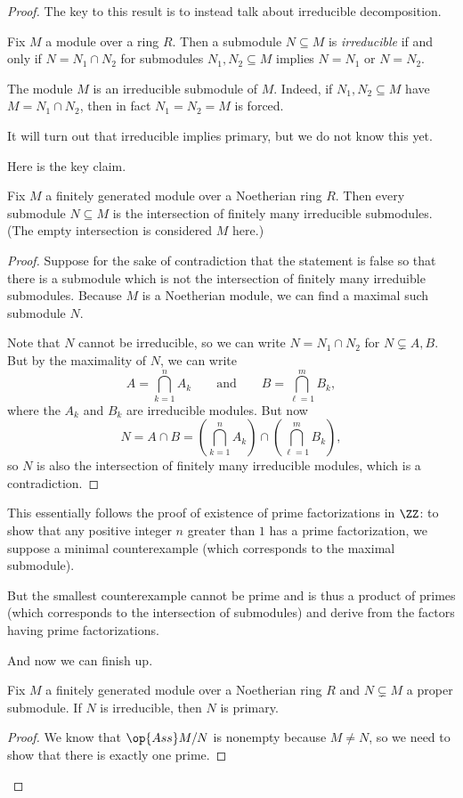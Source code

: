 \begin{proof}
	The key to this result is to instead talk about irreducible decomposition.
	\begin{definition}[Irreducible]
		Fix $M$ a module over a ring $R$. Then a submodule $N\subseteq M$ is \textit{irreducible} if and only if $N=N_1\cap N_2$ for submodules $N_1,N_2\subseteq M$ implies $N=N_1$ or $N=N_2$.
	\end{definition}
	\begin{example} \label{ex:totalisirred}
		The module $M$ is an irreducible submodule of $M$. Indeed, if $N_1,N_2\subseteq M$ have $M=N_1\cap N_2$, then in fact $N_1=N_2=M$ is forced.
	\end{example}
	It will turn out that irreducible implies primary, but we do not know this yet.

	Here is the key claim.
	\begin{lemma}
		Fix $M$ a finitely generated module over a Noetherian ring $R$. Then every submodule $N\subseteq M$ is the intersection of finitely many irreducible submodules. (The empty intersection is considered $M$ here.)
	\end{lemma}
	\begin{proof}
		Suppose for the sake of contradiction that the statement is false so that there is a submodule which is not the intersection of finitely many irreduible submodules. Because $M$ is a Noetherian module, we can find a maximal such submodule $N$.

		Note that $N$ cannot be irreducible, so we can write $N=N_1\cap N_2$ for $N\subsetneq A,B$. But by the maximality of $N$, we can write
		\[A=\bigcap_{k=1}^nA_k\qquad\text{and}\qquad B=\bigcap_{\ell=1}^mB_k,\]
		where the $A_k$ and $B_k$ are irreducible modules. But now
		\[N=A\cap B=\left(\bigcap_{k=1}^nA_k\right)\cap\left(\bigcap_{\ell=1}^mB_k\right),\]
		so $N$ is also the intersection of finitely many irreducible modules, which is a contradiction.
	\end{proof}
	\begin{remark}[Nir]
		This essentially follows the proof of existence of prime factorizations in $\ZZ$: to show that any positive integer $n$ greater than $1$ has a prime factorization, we suppose a minimal counterexample (which corresponds to the maximal submodule).
		
		But the smallest counterexample cannot be prime and is thus a product of primes (which corresponds to the intersection of submodules) and derive from the factors having prime factorizations.
	\end{remark}
	And now we can finish up.
	\begin{lemma}
		Fix $M$ a finitely generated module over a Noetherian ring $R$ and $N\subsetneq M$ a proper submodule. If $N$ is irreducible, then $N$ is primary.
	\end{lemma}
	\begin{proof}
		We know that $\op{Ass}M/N$ is nonempty because $M\ne N$, so we need to show that there is exactly one prime.
		

\end{proof}
\end{proof}
